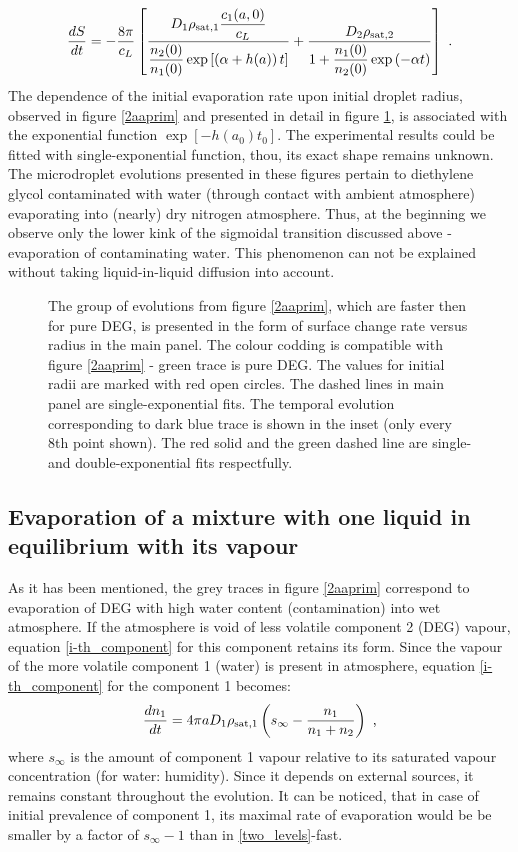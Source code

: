 \documentclass[twoside,twocolumn,9pt]{article}
\begin{document}
\begin{equation}
\frac{dS}{dt} = -\frac{8\pi}{c_L} \left[ \frac{D_1\rho_{{\rm sat},1}\dfrac{c_1(a,0)}{c_L} }{\dfrac{n_{2}(0)}{n_{1}(0)}\exp\left[\left(\alpha + h(a)\right) t\right]} + \dfrac{D_2\rho_{{\rm sat},2}}{1+\dfrac{n_{1}(0)}{n_{2}(0)}\exp\left(-\alpha t\right)} \right] \mbox{~.}
\label{combined}
\end{equation}
The dependence of the initial evaporation rate upon initial droplet radius, observed in figure \ref{2aaprim} and presented in detail in figure \ref{exp_a0}, is associated with the exponential function $\exp \left[ -h(a_0) t_0\right]$. The experimental results could be fitted with single-exponential function, thou, its exact shape remains unknown. The microdroplet evolutions presented in these figures pertain to diethylene glycol contaminated with water (through contact with ambient atmosphere) evaporating into (nearly) dry nitrogen atmosphere. Thus, at the beginning we observe only the lower kink of the sigmoidal transition discussed above - evaporation of contaminating water. This phenomenon can not be explained without taking liquid-in-liquid diffusion into account.
\begin{figure}[htb]
 \centering
 \caption{The group of evolutions from figure \ref{2aaprim}, which are faster then for pure DEG, is presented in the form of surface change rate versus radius in the main panel. The colour codding is compatible with figure \ref{2aaprim} - green trace is pure DEG. The values for initial radii are marked with red open circles. The dashed lines in main panel are single-exponential fits. The temporal evolution corresponding to dark blue trace is shown in the inset (only every 8th point shown). The red solid and the green dashed line are single- and double-exponential fits respectfully.}
 \label{exp_a0}
\end{figure}

\subsection{Evaporation of a mixture with one liquid in equilibrium with its vapour} \label{in-equilibrium}
As it has been mentioned, the grey traces in figure \ref{2aaprim} correspond to evaporation of DEG with high water content (contamination) into wet atmosphere. If the atmosphere is void of less volatile component 2 (DEG) vapour, equation \ref{i-th_component} for this component retains its form. Since the vapour of the more volatile component 1 (water) is present in atmosphere, equation \ref{i-th_component} for the component 1 becomes:
\begin{equation}
\frac{dn_1}{dt} = 4\pi a D_1\rho_{{\rm sat},1} \left( s_{\infty} - \frac{n_1}{n_1+n_2} \right) \mbox{~,}
\label{with_S}
\end{equation}
where $s_{\infty}$ is the amount of component 1 vapour relative to its saturated vapour concentration (for water: humidity). Since it depends on external sources, it remains constant throughout the evolution. It can be noticed, that in case of initial prevalence of component 1, its maximal rate of evaporation would be be smaller by a factor of $ s_{\infty}-1$ than in \ref{two_levels}-fast.
\end{document}
